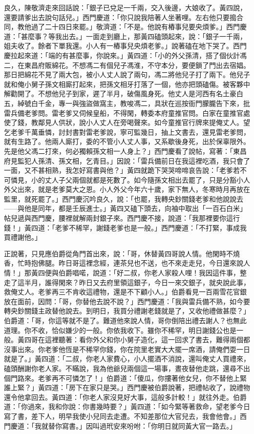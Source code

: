良久，陳敬濟走來回話說：「銀子已兌足一千兩，交入後邊，大娘收了。黃四說，還要請爹出去說句話兒。」西門慶道：「你只說我陪著人坐著哩。左右他只要搗合同，教他過了二十四日來罷。」敬濟道：「不是。他說有樁事兒要央煩爹。」西門慶道：「甚麼事？等我出去。」一面走到廳上，那黃四磕頭起來，說：「銀子一千兩，姐夫收了。餘者下單我還。小人有一樁事兒央煩老爹。」說著磕在地下哭了。西門慶拉起來道：「端的有甚麼事，你說來。」黃四道：「小的外父孫清，搭了個伙計馮二，在東昌府販綿花。不想馮二有個兒子馮淮，不守本分，要便鎖了門出去宿娼。那日把綿花不見了兩大包，被小人丈人說了兩句，馮二將他兒子打了兩下。他兒子就和俺小舅子孫文相廝打起來，把孫文相牙打落了一個，他亦把頭磕傷。被客夥中解勸開了。不想他兒子到家，遲了半月，破傷風身死。他丈人是河西有名土豪白五，綽號白千金，專一與強盜做窩主，教唆馮二，具狀在巡按衙門朦朧告下來，批雷兵備老爹問。雷老爹又伺候皇船，不得閑，轉委本府童推官問。白家在童推官處使了錢，教鄰見人供狀，說小人丈人在旁喝聲來。如今童推官行牌來提俺丈人。望乞老爹千萬垂憐，討封書對雷老爹說，寧可監幾日，抽上文書去，還見雷老爹問，就有生路了。他兩人廝打，委的不管小人丈人事，又系歇後身死，出於保辜限外。先是他父馮二打來，何必獨賴孫文相一人身上？」西門慶看了說帖，寫著：「東昌府見監犯人孫清、孫文相，乞青目。」因說：「雷兵備前日在我這裡吃酒，我只會了一面，又不甚相熟，我怎好寫書與他？」黃四就跪下哭哭啼啼哀告說：「老爹若不可憐見，小的丈人子父兩個就都是死數了。如今隨孫文相出去罷了，只是分豁小人外父出來，就是老爹莫大之恩。小人外父今年六十歲，家下無人，冬寒時月再放在監里，就死罷了。」西門慶沉吟良久，說：「也罷，我轉央鈔關錢老爹和他說說去——與他是同年，都是壬辰進士。」黃四又磕下頭去，向袖中取出「一百石白米」帖兒遞與西門慶，腰裡就解兩封銀子來。西門慶不接，說道：「我那裡要你這行錢！」黃四道：「老爹不稀罕，謝錢老爹也是一般。」西門慶道：「不打緊，事成我買禮謝他。」

正說著，只見應伯爵從角門首出來，說：「哥，休替黃四哥說人情。他閑時不燒香，忙時抱佛腿。昨日哥這裡念經，連茶兒也不送，也不來走走兒，今日還來說人情！」那黃四便與伯爵唱喏，說道：「好二叔，你老人家殺人哩！我因這件事，整走了這半月，誰得閑來？昨日又去府里領這銀子，今日一來交銀子，就央說此事，救俺丈人。老爹再三不肯收這禮物，還是不下顧小人。」伯爵看見一百兩雪花官銀放在面前，因問：「哥，你替他去說不說？」西門慶道：「我與雷兵備不熟，如今要轉央鈔關錢主政替他說去。到明日，我買分禮謝老錢就是了，又收他禮做甚麼？」伯爵道：「哥，你這等就不是了。難道他來說人情，哥你倒陪出禮去謝人？也無此道理。你不收，恰似嫌少的一般。你依我收下。雖你不稀罕，明日謝錢公也是一般。黃四哥在這裡聽著：看你外父和你小舅子造化，這一回求了書去，難得兩個都沒事出來。你老爹他恆是不稀罕你錢，你在院里老實大大擺一席酒，請俺們耍一日就是了。」黃四道：「二叔，你老人家費心，小人擺酒不消說，還叫俺丈人買禮來，磕頭酬謝你老人家。不瞞說，我為他爺兒兩個這一場事，晝夜替他走跳，還尋不出個門路來。老爹再不可憐怎了！」伯爵道：「傻瓜，你摟著他女兒，你不替他上緊誰上緊？」黃四道：「房下在家只是哭。」西門慶被伯爵說著，把禮帖收了，說禮物還令他拿回去。黃四道：「你老人家沒見好大事，這般多計較！」就往外走。伯爵道：「你過來，我和你說：你書幾時要？」黃四道：「如今緊等著救命，望老爹今日寫了書，差下人，明早我使小兒同去走遭。不知差那位大官兒去，我會他會。」西門慶道：「我就替你寫書。」因叫過玳安來吩咐：「你明日就同黃大官一路去。」

